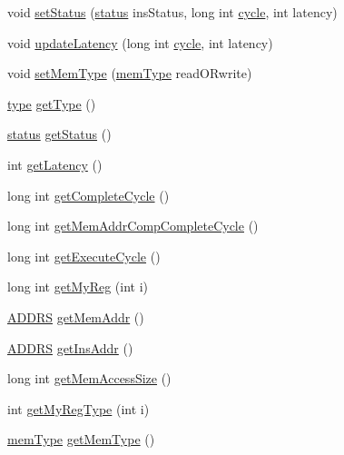 \begin{DoxyCompactItemize}
\item 
void \hyperlink{classinstruction_ab4b1bbe98c775d3a1fab0ed281a4ad4f}{setStatus} (\hyperlink{global_2global_8h_a015eb90e0de9f16e87bd149d4b9ce959}{status} insStatus, long int \hyperlink{vliwScheduler_8cpp_a1f4871d45089b039d95d3832dd123827}{cycle}, int latency)
\item 
void \hyperlink{classinstruction_a818803cc54cb0b34c373ad6537976014}{updateLatency} (long int \hyperlink{vliwScheduler_8cpp_a1f4871d45089b039d95d3832dd123827}{cycle}, int latency)
\item 
void \hyperlink{classinstruction_a6c57d75878f06764457f4faaabe5de00}{setMemType} (\hyperlink{binaryTranslator_2global_8h_a94b8423a23b95a7adac22848b81e7c0c}{memType} readORwrite)
\item 
\hyperlink{binaryTranslator_2global_8h_a7aead736a07eaf25623ad7bfa1f0ee2d}{type} \hyperlink{classinstruction_a47623362d505a662b974624f81288389}{getType} ()
\item 
\hyperlink{global_2global_8h_a015eb90e0de9f16e87bd149d4b9ce959}{status} \hyperlink{classinstruction_ae93f7b1b0385897bb15fc795ee654c37}{getStatus} ()
\item 
int \hyperlink{classinstruction_a842fd50e52a3e3d31fcf8b7a180a32bd}{getLatency} ()
\item 
long int \hyperlink{classinstruction_a509352a63d4ffd931dd5a0a48f4451ba}{getCompleteCycle} ()
\item 
long int \hyperlink{classinstruction_af7c6a53cc4270140e47c885d51e55845}{getMemAddrCompCompleteCycle} ()
\item 
long int \hyperlink{classinstruction_a85915959a0db53205b721c2593941785}{getExecuteCycle} ()
\item 
long int \hyperlink{classinstruction_a6731a49c3bca293edf8fd1eb57fda995}{getMyReg} (int i)
\item 
\hyperlink{global_2global_8h_a7ea74bb9ffd2e4d41550ae2383dd25bc}{ADDRS} \hyperlink{classinstruction_a507811b2f10f679c90ac79ff64929272}{getMemAddr} ()
\item 
\hyperlink{global_2global_8h_a7ea74bb9ffd2e4d41550ae2383dd25bc}{ADDRS} \hyperlink{classinstruction_ac1fabe854c85726785052c7a5ebf6d39}{getInsAddr} ()
\item 
long int \hyperlink{classinstruction_a7811c2dd5418e30c53d2da2460e0d47c}{getMemAccessSize} ()
\item 
int \hyperlink{classinstruction_a0f74a2a6cca80ebc2286daa72e1dfbbd}{getMyRegType} (int i)
\item 
\hyperlink{binaryTranslator_2global_8h_a94b8423a23b95a7adac22848b81e7c0c}{memType} \hyperlink{classinstruction_a8051847b8731d697107d682564a7385f}{getMemType} ()

\end{DoxyCompactItemize}
